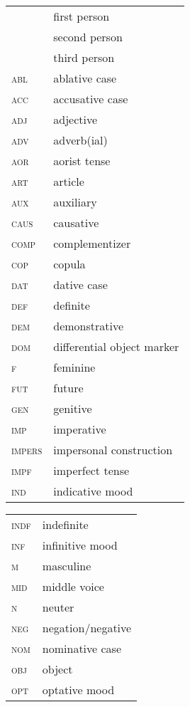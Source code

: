 \documentclass[output=paper,colorlinks,citecolor=brown]{langscibook}
\begin{document}
\begin{table}
    \centering
\begin{tabularx}{.5\textwidth}{>{\hsize=0.5\hsize}X>{\hsize=1.5\hsize}X}
1 & first person \\
2 & second person \\
3 & third person \\
\textsc{abl} & ablative case \\
\textsc{acc} & accusative case \\
\textsc{adj} & adjective \\
\textsc{adv} & adverb(ial)  \\
*\textsc{aor} & aorist tense \\
\textsc{art} & article \\
\textsc{aux} & auxiliary \\
\textsc{caus} & causative \\
\textsc{comp} & complementizer \\ 
\textsc{cop} & copula \\
\textsc{dat} & dative case \\
\textsc{def} & definite \\
\textsc{dem} & demonstrative \\
*\textsc{dom} & differential object marker\\
\textsc{f} & feminine \\
\textsc{fut} & future \\
\textsc{gen} & genitive \\
\textsc{imp} & imperative \\
*\textsc{impers} & impersonal construction \\
*\textsc{impf} & imperfect tense \\
\textsc{ind} & indicative mood \\
\end{tabularx}%
\begin{tabularx}{.5\textwidth}{>{\hsize=0.5\hsize}X>{\hsize=1.5\hsize}X}
\textsc{indf} & indefinite \\
\textsc{inf} & infinitive mood \\
\textsc{m} & masculine \\
*\textsc{mid} & middle voice \\
\textsc{n} & neuter \\
\textsc{neg} & negation/negative \\
\textsc{nom} & nominative case \\
\textsc{obj} & object \\
*\textsc{opt} & optative mood \\

\end{tabularx}
\end{table}
\end{document}
